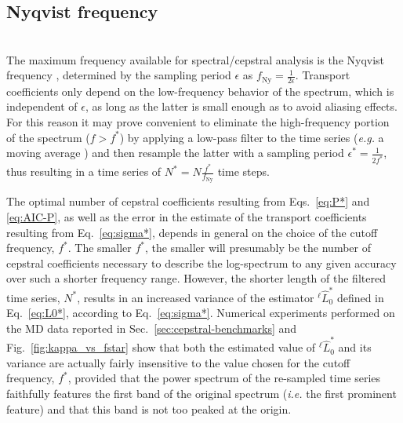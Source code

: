 \subsection{Nyqvist frequency}  \label{sec:cepstral-nyqvist}
\\
The maximum frequency available for spectral/cepstral analysis is the Nyqvist frequency \cite{Oppenheim1999}, determined by the sampling period $\epsilon$ as $f_{\mathrm{Ny}}=\frac{1}{2\epsilon}$. Transport coefficients only depend on the low-frequency behavior of the spectrum, which is independent of $\epsilon$, as long as the latter is small enough as to avoid aliasing effects. For this reason it may prove convenient to eliminate the high-frequency portion of the spectrum ($f>f^*$) by applying a low-pass filter to the time series (\emph{e.g.} a moving average \cite{MovingAverage}) and then resample the latter with a sampling period $\epsilon^*=\frac{1}{2f^*}$, thus resulting in a time series of $N^*=N\frac{f^*}{f_{\mathrm{Ny}}}$ time steps.

The optimal number of cepstral coefficients resulting from Eqs.~\eqref{eq:P*} and \eqref{eq:AIC-P}, as well as the error in the estimate of the transport coefficients resulting from Eq.~\eqref{eq:sigma*}, depends in general on the choice of the cutoff frequency, $f^*$. The smaller $f^*$, the smaller will presumably be the number of cepstral coefficients necessary to describe the log-spectrum to any given accuracy over such a shorter frequency range. However, the shorter length of the filtered time series, $N^*$, results in an increased variance of the estimator $^\ell{\hat L^*_0}$ defined in Eq.~\eqref{eq:L0*}, according to Eq.~\eqref{eq:sigma*}. Numerical experiments performed on the MD data reported in Sec.~\ref{sec:cepstral-benchmarks} and Fig.~\ref{fig:kappa_vs_fstar} show that both the estimated value of $^\ell{\hat L^*_0}$ and its variance are actually fairly insensitive to the value chosen for the cutoff frequency, $f^*$, provided that the power spectrum of the re-sampled time series faithfully features the first band of the original spectrum (\emph{i.e.} the first prominent feature) and that this band is not too peaked at the origin.


